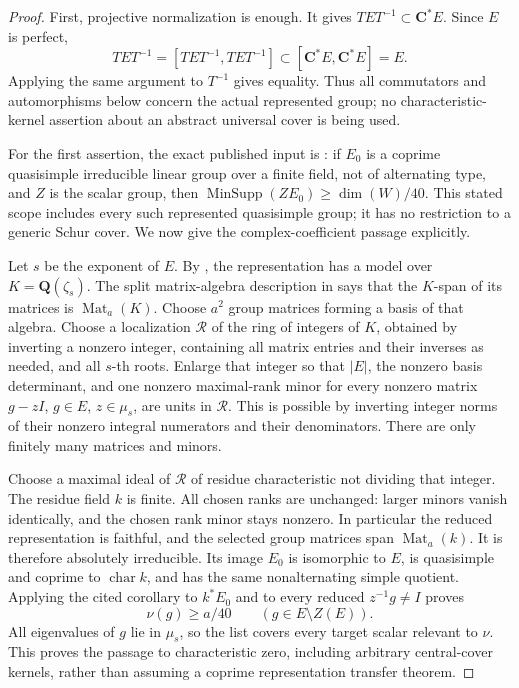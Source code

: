 \begin{proof}
First, projective normalization is enough.  It gives
\(TET^{-1}\subset\mathbf C^*E\).  Since \(E\) is perfect,
\[
 TET^{-1}=[TET^{-1},TET^{-1}]
       \subset[\mathbf C^*E,\mathbf C^*E]=E.
 \tag{FTQ.3}
\]
Applying the same argument to \(T^{-1}\) gives equality.  Thus all
commutators and automorphisms below concern the actual represented
group; no characteristic-kernel assertion about an abstract
universal cover is being used.

For the first assertion, the exact published input is
\cite[Corollary~4.3, p.~142]{BI:DHP}: if \(E_0\) is a coprime
quasisimple irreducible linear group over a finite field, not of
alternating type, and \(Z\) is the scalar group, then
\(\operatorname{MinSupp}(ZE_0)\ge\dim(W)/40\).
This stated scope includes every such represented quasisimple
group; it has no restriction to a generic Schur cover.
We now give the complex-coefficient passage explicitly.

Let \(s\) be the exponent of \(E\).  By
\cite[Section~12.3, Theorem~24 and proof, p.~94]{OG:Serre1977},
the representation has a model over \(K=\mathbf Q(\zeta_s)\).
The split matrix-algebra description in
\cite[Section~12.2, pp.~92--93]{OG:Serre1977} says that the
\(K\)-span of its matrices is \(\operatorname{Mat}_a(K)\).
Choose \(a^2\) group matrices forming a basis of that algebra.
Choose a localization \(\mathcal R\) of the ring of integers of
\(K\), obtained by inverting a nonzero integer, containing all
matrix entries and their inverses as needed, and all \(s\)-th roots.
Enlarge that integer so that \(|E|\), the nonzero basis determinant,
and one nonzero maximal-rank minor for every nonzero matrix
\(g-zI\), \(g\in E\), \(z\in\mu_s\), are units in
\(\mathcal R\).  This is possible by inverting integer norms of
their nonzero integral numerators and their denominators.
There are only finitely many matrices and minors.

Choose a maximal ideal of \(\mathcal R\) of residue characteristic
not dividing that integer.  The residue field \(k\) is finite.
All chosen ranks are unchanged: larger minors vanish identically,
and the chosen rank minor stays nonzero.  In particular the reduced
representation is faithful, and the selected group matrices span
\(\operatorname{Mat}_a(k)\).  It is therefore absolutely
irreducible.  Its image \(E_0\) is isomorphic to \(E\), is
quasisimple and coprime to \(\operatorname{char}k\), and has the
same nonalternating simple quotient.  Applying the cited corollary
to \(k^*E_0\) and to every reduced \(z^{-1}g\ne I\) proves
\[
                 \nu(g)\ge a/40\qquad(g\in E\setminus Z(E)).
 \tag{FTQ.4}
\]
All eigenvalues of \(g\) lie in \(\mu_s\), so the list covers every
target scalar relevant to \(\nu\).  This proves the passage to
characteristic zero, including arbitrary central-cover kernels,
rather than assuming a coprime representation transfer theorem.


\end{proof}

